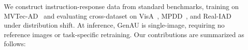 We construct instruction-response data from standard benchmarks, training on MVTec-AD~\cite{Bergmann_2019_CVPR} and evaluating cross-dataset on VisA~\cite{VisA}, MPDD~\cite{mpdd}, and Real-IAD~\cite{wang2024realiadrealworldmultiviewdataset} under distribution shift. At inference, GenAU is single-image, requiring no reference images or task-specific retraining.
Our contributions are summarized as follows:
